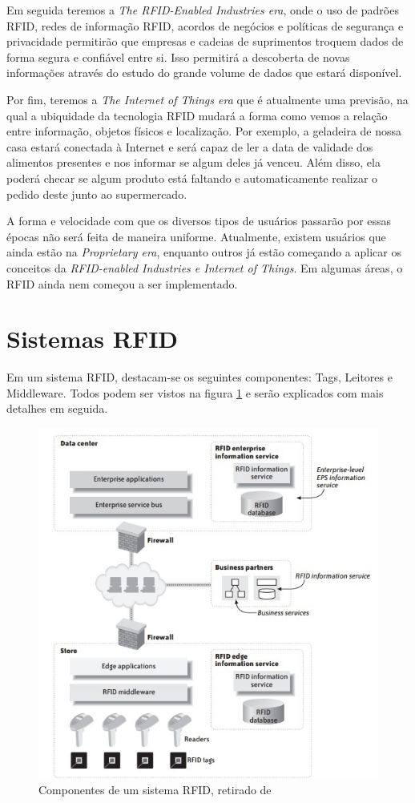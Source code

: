 \documentclass[a4paper,12pt,titlepage]{article}
\begin{document}
	Em seguida teremos a \textit{The RFID-Enabled Industries era}, onde o uso de padrões RFID, redes de informação RFID, acordos de negócios e políticas de segurança e privacidade permitirão que empresas e cadeias de suprimentos troquem dados de forma segura e confiável entre si. Isso permitirá a descoberta de novas informações através do estudo  do grande volume de dados que estará disponível.   
	   
	Por fim, teremos a \textit{The Internet of Things era} que é atualmente uma previsão, na qual a ubiquidade da tecnologia RFID mudará a forma como vemos a relação entre informação, objetos físicos e localização. Por exemplo, a geladeira de nossa casa estará conectada à Internet e será capaz de ler a data de validade dos alimentos presentes e nos informar se algum deles já venceu. Além disso, ela poderá checar se algum produto está faltando e automaticamente realizar o pedido deste junto ao supermercado.
	
	A forma e velocidade com que os diversos tipos de usuários passarão por essas épocas não será feita de maneira uniforme. Atualmente, existem usuários que ainda estão na \textit{Proprietary era}, enquanto outros já estão começando a aplicar os conceitos da \textit{RFID-enabled Industries e Internet of Things}. Em algumas áreas, o RFID ainda nem começou a ser implementado.
	
	
	\section{Sistemas RFID}
	
	Em um sistema RFID, destacam-se os seguintes componentes: Tags, Leitores e Middleware. Todos podem ser vistos na figura \ref{fig:rfidcomp} e serão explicados com mais detalhes em seguida.
	
	\begin{figure}[h!]
		\centering
		\includegraphics[width=0.5\linewidth]{rfidsys3}
		\caption{Componentes de um sistema RFID, retirado de \cite{rfidbook}}
		\label{fig:rfidcomp}
	\end{figure}
	
\end{document}
